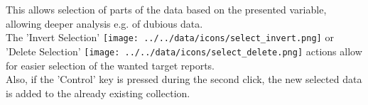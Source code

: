 This allows selection of parts of the data based on the presented variable, allowing deeper analysis e.g. of dubious data. \\

The 'Invert Selection' \texttt{[image: ../../data/icons/select\_invert.png]} or 'Delete Selection' \texttt{[image: ../../data/icons/select\_delete.png]} actions allow for easier selection of the wanted target reports. \\

Also, if the 'Control' key is pressed during the second click, the new selected data is added to the already existing collection.









